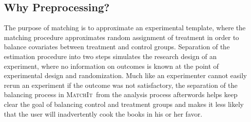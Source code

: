 \documentclass[oneside,letterpaper,titlepage]{article}
\newcommand{\MatchIt}{\textsc{MatchIt}}
\begin{document}
\subsection{Why Preprocessing?}

The purpose of matching is to approximate an experimental template,
where the matching procedure approximates random assignment of
treatment in order to balance covariates between treatment and control
groups.  Separation of the estimation procedure into two steps
simulates the research design of an experiment, where no information
on outcomes is known at the point of experimental design and
randomization.  Much like an experimenter cannot easily rerun an
experiment if the outcome was not satisfactory, the separation of the
balancing process in \MatchIt\ from the analysis process afterwords
helps keep clear the goal of balancing control and treatment groups
and makes it less likely that the user will inadvertently cook the
books in his or her favor.


\clearpage


\end{document}
